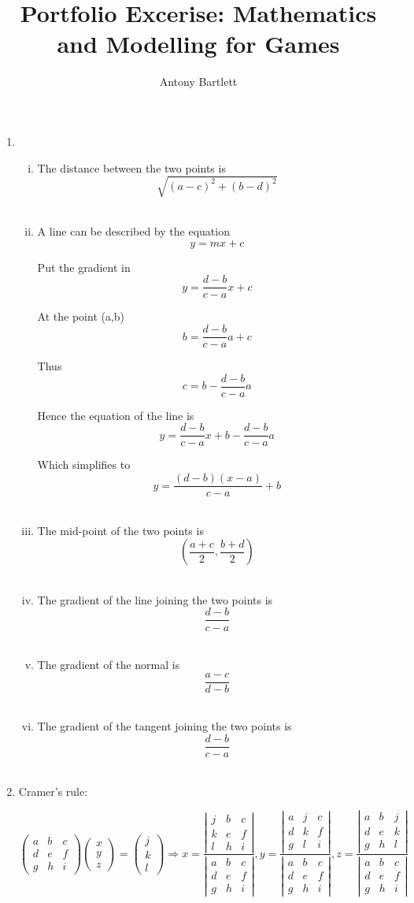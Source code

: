 \documentclass{article}
\def\cramersMatrix#1#2#3#4#5#6#7#8#9{
  \def\a{{#1}}
  \def\b{{#2}}
  \def\c{{#3}}
  \def\d{{#4}}
  \def\e{{#5}}
  \def\f{{#6}}
  \def\g{{#7}}
  \def\h{{#8}}
  \def\i{{#9}}
}
\def\cramersVector#1#2#3{
  \def\j{{#1}}
  \def\k{{#2}}
  \def\l{{#3}}
}
\newcommand{\cramers}[0]
{
\[
	\left(
		\begin{array}{ccc}
			\a & \b & \c \\
			\d & \e & \f \\
			\g & \h & \i
		\end{array}
	\right)
	\left(
		\begin{array}{c}
			x \\
			y \\
			z
		\end{array}
	\right)
	=
	\left(
		\begin{array}{c}
			\j \\
			\k \\
			\l
		\end{array}
	\right)
	\Rightarrow
	x=
	\frac
	{
		\left|
			\begin{array}{ccc}
				\j & \b & \c \\
				\k & \e & \f \\
				\l & \h & \i
			\end{array}
		\right|
	}
	{
		\left|
			\begin{array}{ccc}
				\a & \b & \c \\
				\d & \e & \f \\
				\g & \h & \i
			\end{array}
		\right|
	},
	y=
	\frac
	{
		\left|
			\begin{array}{ccc}
				\a & \j & \c \\
				\d & \k & \f \\
				\g & \l & \i
			\end{array}
		\right|
	}
	{
		\left|
			\begin{array}{ccc}
				\a & \b & \c \\
				\d & \e & \f \\
				\g & \h & \i
			\end{array}
		\right|
	},
	z=
	\frac
	{
		\left|
			\begin{array}{ccc}
				\a & \b & \j \\
				\d & \e & \k \\
				\g & \h & \l
			\end{array}
		\right|
	}
	{
		\left|
			\begin{array}{ccc}
				\a & \b & \c \\
				\d & \e & \f \\
				\g & \h & \i
			\end{array}
		\right|
	}
\]
}
\begin{document}
\title{Portfolio Excerise: Mathematics and Modelling for Games}
\author{Antony Bartlett}
\maketitle
\begin{enumerate}

\item

\begin{enumerate}[i.]

\item The distance between the two points is
\[
\sqrt{ (a-c)^2 + (b-d)^2 }
\]
\\

\item A line can be described by the equation
\[
y=mx+c
\]

Put the gradient in
\[
y=\frac{d-b}{c-a}x+c
\]

At the point (a,b)
\[
b=\frac{d-b}{c-a}a + c
\]

Thus
\[
c=b - \frac{d-b}{c-a}a
\]

Hence the equation of the line is
\[
y=\frac{d-b}{c-a}x+b - \frac{d-b}{c-a}a
\]

Which simplifies to
\[
y=\frac{(d-b)(x-a)}{c-a} + b
\]
\\

\item The mid-point of the two points is
\[
(\frac{a+c}{2}, \frac{b+d}{2})
\]
\\

\item The gradient of the line joining the two points is
\[
\frac{d-b}{c-a}
\]
\\

\item The gradient of the normal is
\[
\frac{a-c}{d-b}
\]
\\

\item The gradient of the tangent joining the two points is
\[
\frac{d-b}{c-a}
\]
\\

\end{enumerate}

\item Cramer's rule:
\cramersMatrix{a}{b}{c}{d}{e}{f}{g}{h}{i}
\cramersVector{j}{k}{l}
\cramers


\end{enumerate}
\end{document}
